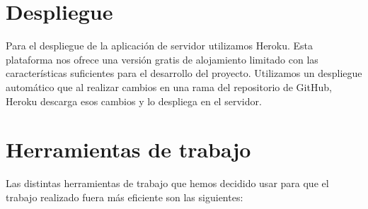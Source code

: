\section{Despliegue}
\label{makereference4.6}
Para el despliegue de la aplicación de servidor utilizamos Heroku.
Esta plataforma nos ofrece una versión gratis de alojamiento limitado con las
 características suficientes para el desarrollo del proyecto.
Utilizamos un despliegue automático que al realizar cambios en una rama del
 repositorio de GitHub, Heroku descarga esos cambios y lo despliega en el servidor.

\section{Herramientas de trabajo}
\label{makereference4.7}
Las distintas herramientas de trabajo que hemos decidido usar para que el trabajo realizado fuera más eficiente son las siguientes:
